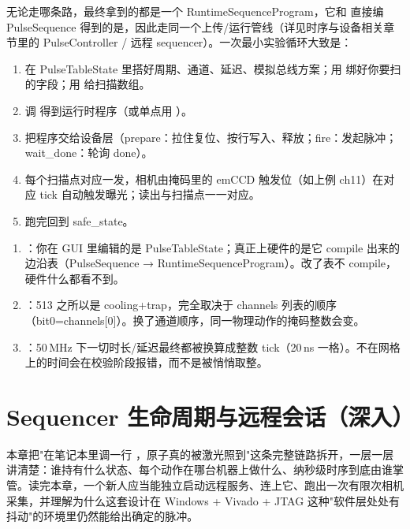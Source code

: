 \documentclass[11pt,oneside,openany]{book}
\begin{document}
无论走哪条路，最终拿到的都是一个 RuntimeSequenceProgram，它和  直接编 PulseSequence 得到的是，因此走同一个上传/运行管线（详见时序与设备相关章节里的 PulseController / 远程 sequencer）。一次最小实验循环大致是：

\begin{enumerate}
\item 在 PulseTableState 里搭好周期、通道、延迟、模拟总线方案；用  绑好你要扫的字段；用  给扫描数组。
\item 调  得到运行时程序（或单点用 ）。
\item 把程序交给设备层（prepare：拉住复位、按行写入、释放；fire：发起脉冲；wait\_done：轮询 done）。
\item 每个扫描点对应一发，相机由掩码里的 emCCD 触发位（如上例 ch11）在对应 tick 自动触发曝光；读出与扫描点一一对应。
\item 跑完回到 safe\_state。
\end{enumerate}

\begin{notebox}[新人最容易踩的三个坑]
\begin{enumerate}
\item {}：你在 GUI 里编辑的是 PulseTableState；真正上硬件的是它 compile 出来的边沿表（PulseSequence → RuntimeSequenceProgram）。改了表不 compile，硬件什么都看不到。
\item {}：513 之所以是 cooling+trap，完全取决于 channels 列表的顺序（bit0=channels[0]）。换了通道顺序，同一物理动作的掩码整数会变。
\item {}：50\,MHz 下一切时长/延迟最终都被换算成整数 tick（20\,ns 一格）。不在网格上的时间会在校验阶段报错，而不是被悄悄取整。
\end{enumerate}
\end{notebox}

\chapter{Sequencer 生命周期与远程会话（深入）}

本章把"在笔记本里调一行 ，原子真的被激光照到"这条完整链路拆开，一层一层讲清楚：谁持有什么状态、每个动作在哪台机器上做什么、纳秒级时序到底由谁掌管。读完本章，一个新人应当能独立启动远程服务、连上它、跑出一次有限次相机采集，并理解为什么这套设计在 Windows + Vivado + JTAG 这种"软件层处处有抖动"的环境里仍然能给出确定的脉冲。
\end{document}
